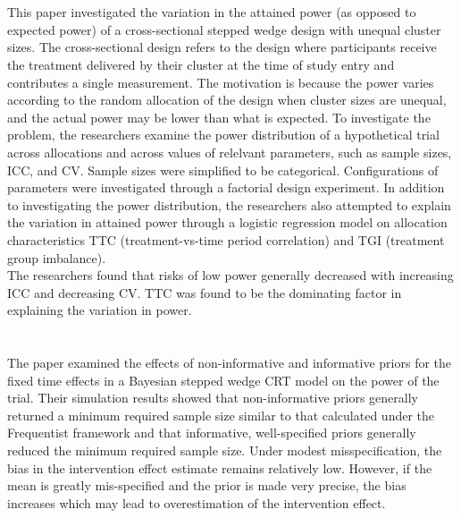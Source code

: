 \documentclass{article}
\begin{document}
\newpage


\section{\textcite{Ouyang:2020}}

This paper investigated the variation in the attained power (as opposed to expected power) of a cross-sectional stepped wedge design with unequal cluster sizes. The cross-sectional design refers to the design where participants receive the treatment delivered by their cluster at the time of study entry and contributes a single measurement. The motivation is because the power varies according to the random allocation of the design when cluster sizes are unequal, and the actual power may be lower than what is expected. To investigate the problem, the researchers examine the power distribution of a hypothetical trial across allocations and across values of relelvant parameters, such as sample sizes, ICC, and CV. Sample sizes were simplified to be categorical. Configurations of parameters were investigated through a factorial design experiment. In addition to investigating the power distribution, the researchers also attempted to explain the variation in attained power through a logistic regression model on allocation characteristics TTC (treatment-vs-time period correlation) and TGI (treatment group imbalance).
\\

The researchers found that risks of low power generally decreased with increasing ICC and decreasing CV. TTC was found to be the dominating factor in explaining the variation in power.


\newpage


\section{\textcite{Zhan:2021}}

The paper examined the effects of non-informative and informative priors for the fixed time effects in a Bayesian stepped wedge CRT model on the power of the trial. Their simulation results showed that non-informative priors generally returned a minimum required sample size similar to that calculated under the Frequentist framework and that informative, well-specified priors generally reduced the minimum required sample size. Under modest misspecification, the bias in the intervention effect estimate remains relatively low. However, if the mean is greatly mis-specified and the prior is made very precise, the bias increases which may lead to overestimation of the intervention effect.
\end{document}
